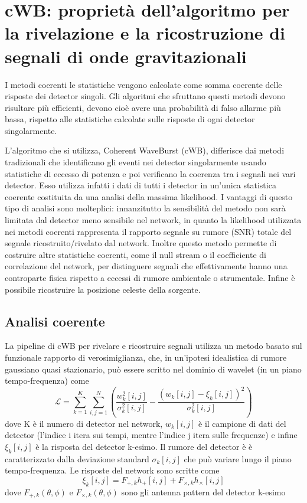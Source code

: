 \chapter[cWB]{cWB: proprietà dell'algoritmo per la rivelazione e la ricostruzione di segnali di onde gravitazionali}
\label{chapter:cwb}

I metodi coerenti le statistiche vengono calcolate come somma coerente delle risposte dei detector singoli. Gli algoritmi che sfruttano questi metodi devono risultare più efficienti, devono cioè avere una probabilità di falso allarme più bassa, rispetto alle statistiche calcolate sulle risposte di ogni detector singolarmente.

L'algoritmo che si utilizza, Coherent WaveBurst (cWB), differisce dai metodi tradizionali che identificano gli eventi nei detector singolarmente usando statistiche di eccesso di potenza e poi verificano la coerenza tra i segnali nei vari detector. Esso utilizza infatti i dati di tutti i detector in un'unica statistica coerente costituita da una analisi della massima likelihood. 
I vantaggi di questo tipo di analisi sono molteplici: innanzitutto la sensibilità del metodo non sarà limitata dal detector meno sensibile nel network, in quanto la likelihood utilizzata nei metodi coerenti rappresenta il rapporto segnale su rumore (SNR) totale del segnale ricostruito/rivelato dal network. Inoltre questo metodo permette di costruire altre statistiche coerenti, come il null stream o il coefficiente di correlazione  del network, per distinguere segnali che effettivamente hanno una controparte fisica rispetto a eccessi di rumore ambientale o strumentale. Infine è possibile ricostruire la posizione celeste della sorgente.
\section{Analisi coerente}
La pipeline di cWB per rivelare e ricostruire segnali utilizza un metodo basato sul funzionale rapporto di verosimiglianza, che, in un'ipotesi idealistica di rumore gaussiano quasi stazionario, può essere scritto nel dominio di wavelet (in un piano tempo-frequenza) come
\begin{equation}
	\mathcal{L} = \sum_{k=1}^{K}\sum_{i,j=1}^{N}\left(\frac{w_k^2[i,j]}{\sigma_k^2[i,j]} - \frac{(w_k[i,j]-\xi_k[i,j])^2}{\sigma_k^2[i,j]}  \right)
\end{equation}
dove K è il numero di detector nel network, $w_k[i,j]$ è il campione di dati del detector (l'indice i itera sui tempi, mentre l'indice j itera sulle frequenze) e infine $\xi_k[i,j]$ è la risposta del detector k-esimo.
Il rumore del detector è è caratterizzato dalla deviazione standard $\sigma_k[i,j]$ che può variare lungo il piano tempo-frequenza.
Le risposte del network sono scritte come
\begin{equation}
	\xi_k[i,j] = F_{+,k}h_+[i,j] + F_{\times,k}h_\times[i,j]
\end{equation}
dove $F_{+,k}(\theta,\phi)$ e $F_{\times,k}(\theta,\phi)$ sono gli antenna pattern del detector k-esimo

